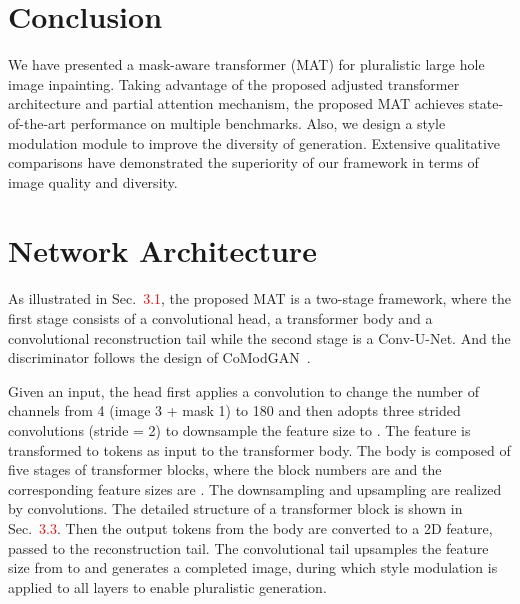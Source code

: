 \documentclass[10pt,twocolumn,letterpaper]{article}
\begin{document}
	
	\section{Conclusion}
	
	We have presented a mask-aware transformer (MAT) for pluralistic large hole image inpainting. Taking advantage of the proposed adjusted transformer architecture and partial attention mechanism, the proposed MAT achieves state-of-the-art performance on multiple benchmarks. Also, we design a style modulation module to improve the diversity of generation. Extensive qualitative comparisons have demonstrated the superiority of our framework in terms of image quality and diversity. 

	{\small
		
		
	}
	
	\clearpage
	
	\renewcommand\thesection{\Alph{section}}
	\renewcommand\thesubsection{\thesection.\arabic{subsection}}
	\renewcommand\thefigure{\Alph{section}.\arabic{figure}}
	\renewcommand\thetable{\Alph{section}.\arabic{table}} 
	
	\setcounter{section}{0}
	\setcounter{figure}{0}
	\setcounter{table}{0}
	
	

	\section{Network Architecture}
	\label{sec:net}
	As illustrated in Sec.~\textcolor{red}{3.1}, the proposed MAT is a two-stage framework, where the first stage consists of a convolutional head, a transformer body and a convolutional reconstruction tail while the second stage is a Conv-U-Net. And the discriminator follows the design of CoModGAN~\cite{zhao2020large}.
	
	Given an  input, the head first applies a convolution to change the number of channels from 4 (image 3 + mask 1) to 180 and then adopts three strided convolutions (stride = 2) to downsample the feature size to . The feature is transformed to tokens as input to the transformer body. The body is composed of five stages of transformer blocks, where the block numbers are  and the corresponding feature sizes are . The downsampling and upsampling are realized by convolutions. The detailed structure of a transformer block is shown in Sec.~\textcolor{red}{3.3}. Then the output tokens from the body are converted to a 2D feature, passed to the reconstruction tail. The convolutional tail upsamples the feature size from  to  and generates a completed image, during which style modulation is applied to all layers to enable pluralistic generation.
	
\end{document}
